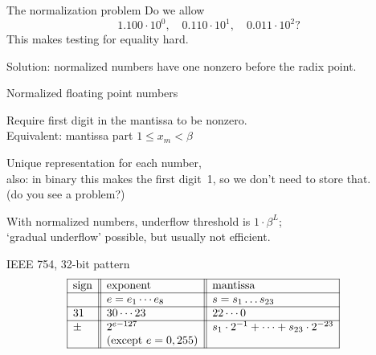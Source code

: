 \begin{numberedframe}{The normalization problem}
  Do we allow
  \[ 1.100\cdot 10^{0},\quad 0.110\cdot 10^1,\quad 0.011\cdot
  10^{2}? \]
  This makes testing for equality hard.

  Solution: normalized numbers have one nonzero before the radix point.
\end{numberedframe}

\begin{numberedframe}{Normalized floating point numbers}

Require first digit in the mantissa to be nonzero.\\
Equivalent: mantissa part $1\leq x_m<\beta$

Unique representation for each number,\\
also: in binary this makes the first digit~1, so we don't need to
store that.\\
(do you see a problem?)

With normalized numbers, underflow threshold is
$1\cdot\beta^L$;\\
`gradual underflow' possible, but usually not efficient.
\end{numberedframe}

\begin{numberedframe}{IEEE 754, 32-bit pattern}
\small
  \[
  \begin{array}{| l || l || l |}
    \hline
    \hbox{sign}&\hbox{exponent}&\hbox{mantissa}\\
    \hline
    &e=e_1\cdots e_8 &s=s_1\dots s_{23}\\
    \hline
    31&30\cdots 23&22\cdots 0\\
    \hline
    \pm & 2^{e-127} & s_1\cdot 2^{-1}+\cdots + s_{23}\cdot 2^{-23} \\
    & \hbox{(except $e=0,255$)} & \\
    \hline
  \end{array}\quad
  \]
\end{numberedframe}

